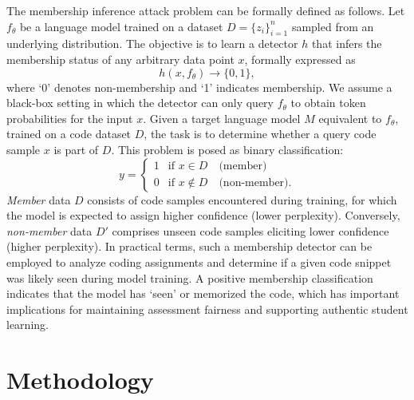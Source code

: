 \documentclass[runningheads]{llncs}
\begin{document}
The membership inference attack problem can be formally defined as follows. Let \( f_{\theta} \) be a language model trained on a dataset \( D = \{ z_i \}_{i=1}^n \) sampled from an underlying distribution. The objective is to learn a detector \( h \) that infers the membership status of any arbitrary data point \( x \), formally expressed as
\[
h(x, f_{\theta}) \to \{0, 1\},
\]
where `0' denotes non-membership and `1' indicates membership. We assume a black-box setting in which the detector can only query \( f_{\theta} \) to obtain token probabilities for the input \( x \). Given a target language model \( M \) equivalent to \( f_{\theta} \), trained on a code dataset \( D \), the task is to determine whether a query code sample \( x \) is part of \( D \). This problem is posed as binary classification:
\[
y =
\begin{cases}
1 & \text{if } x \in D \quad \text{(member)} \\
0 & \text{if } x \notin D \quad \text{(non-member)}.
\end{cases}
\]
\textit{Member} data \( D \) consists of code samples encountered during training, for which the model is expected to assign higher confidence (lower perplexity). Conversely, \textit{non-member} data \( D' \) comprises unseen code samples eliciting lower confidence (higher perplexity). In practical terms, such a membership detector can be employed to analyze coding assignments and determine if a given code snippet was likely seen during model training. A positive membership classification indicates that the model has ‘seen’ or memorized the code, which has important implications for maintaining assessment fairness and supporting authentic student learning.


\section{Methodology}


\end{document}

